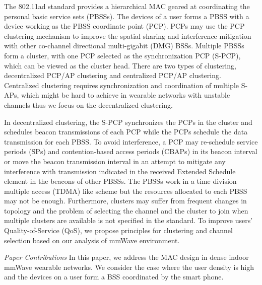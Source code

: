 \documentclass[10pt, conference, letterpaper]{IEEEtran}
\begin{document}
The 802.11ad standard provides a hierarchical MAC geared at coordinating the personal basic service sets (PBSSs). The devices of a user forms a PBSS with a device working as the PBSS coordinate point (PCP). PCPs may use the PCP clustering mechanism to improve the spatial sharing and interference mitigation with other co-channel directional multi-gigabit (DMG) BSSs. Multiple PBSSs form a cluster, with one PCP selected as the synchronization PCP (S-PCP), which can be viewed as the cluster head.
There are two types of clustering, decentralized PCP/AP clustering and centralized PCP/AP clustering. Centralized clustering requires synchronization and coordination of multiple S-APs, which might be hard to achieve in wearable networks with unstable channels thus we focus on the decentralized clustering. 

In decentralized clustering, the 
S-PCP synchronizes the PCPs in the cluster and schedules beacon transmissions of each PCP while the PCPs schedule the data transmission for each PBSS. To avoid interference, a PCP may re-schedule service periods (SPs) and contention-based access periods (CBAPs) in its beacon interval or move the beacon transmission interval in an attempt to mitigate any interference with transmission indicated in the received Extended Schedule element in the beacons of other PBSSs. The PBSSs work in a time division multiple access (TDMA) like scheme but the resources allocated to each PBSS may not be enough. Furthermore, clusters may suffer from frequent changes in topology and the problem of selecting the channel and the cluster to join when multiple clusters are available is not specified in the standard. To improve users' Quality-of-Service (QoS), we propose principles for clustering and channel selection based on our analysis of mmWave environment.

\emph{Paper Contributions}
In this paper, we address the MAC design in dense indoor mmWave wearable networks. We consider the case where the user density is high and the devices on a user form a BSS coordinated by the smart phone. %
\end{document}
